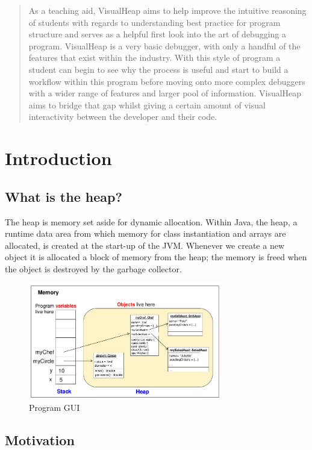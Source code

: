 \documentclass[11pt, a4paper]{report}
\begin{document}
\begin{abstract}
As a teaching aid, VisualHeap aims to help improve the intuitive reasoning of students with regards to understanding best practice for program structure and serves as a helpful first look into the art of debugging a program. VisualHeap is a very basic debugger, with only a handful of the features that exist within the industry. With this style of program a student can begin to see why the process is useful and start to build a workflow within this program before moving onto more complex debuggers with a wider range of features and larger pool of information.  VisualHeap aims to bridge that gap whilst giving a certain amount of visual interactivity between the developer and their code. 
\end{abstract}

\chapter{Introduction}
\section{What is the heap?}

The heap is memory set aside for dynamic allocation. Within Java, the heap, a runtime data area from which memory for class instantiation and arrays are allocated, is created at the start-up of the JVM. Whenever we create a new object it is allocated a block of memory from the heap; the memory is freed when the object is destroyed by the garbage collector.

\begin{figure}[h]
        \centering
        \includegraphics[width=0.75\textwidth]{images/final/heap.png}
        \caption{Program GUI}
\end{figure}

\section{Motivation}
\end{document}
